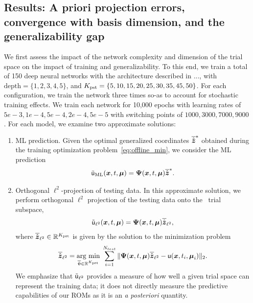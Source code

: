 \documentclass[3p,computermodern,10pt]{elsarticle}
\begin{document}
\subsection{Results: A priori projection errors, convergence with basis dimension, and the generalizability gap}
We first assess the impact of the network complexity and dimension of the trial space on the impact of training and generalizability. To this end, we train a total of 150 deep neural networks with the architecture described in ..., with $\text{depth} = \{1,2,3,4,5\}$, and $K_{\text{pst}} = \{5,10,15,20,25,30,35,45,50\}$. For each configuration, we train the network three times so-as to account for stochastic training effects. We train each network for 10,000 epochs with learning rates of $5e-3,1e-4,5e-4,2e-4,5e-5$ with switching points of $1000,3000,7000,9000$. For each model, we examine two approximate solutions:
\begin{enumerate}
\item ML prediction. Given the optimal generalized coordinates $\overline{\hat{\boldsymbol z}}^*$ obtained during the training optimization problem~\eqref{eq:offline_min}, we consider the ML prediction
$$\tilde{\mathsf{u}}_{\text{ML}}(\boldsymbol x,t,\boldsymbol \mu)= \boldsymbol \Psi(\boldsymbol x,t,\boldsymbol \mu) \overline{\hat{\boldsymbol z}}^*.$$ 
\item Orthogonal $\ell^2$-projection of testing data. In this approximate solution, we perform orthogonal $\ell^2$ projection of the testing data onto the \parametricSpaceTimeAcronym\ trial subspace,
$$\tilde{\mathsf{u}}_{\ell^2}(\boldsymbol x,t,\boldsymbol \mu) = \boldsymbol \Psi(\boldsymbol x,t,\boldsymbol \mu) \overline{\hat{\boldsymbol z}}_{\ell^2},$$
where $\overline{\hat{\boldsymbol z}}_{\ell^2} \in \mathbb{R}^{K_{\text{pst}}}$ is given by the solution to the minimization problem
$$\overline{\hat{\boldsymbol z}}_{\ell^2} = \underset{ \overline{\hat{\boldsymbol v}} \in \mathbb{R}^{K_{\text{pst}}} }{\text{arg min} } \; \sum_{i=1}^{N_{test}} \| \boldsymbol \Psi(\boldsymbol x,t,\boldsymbol \mu) \overline{\hat{\boldsymbol z}}_{\ell^2}  - \mathsf{u}(\boldsymbol x,t_i,\boldsymbol \mu_i) \|_2.$$
We emphasize that $\tilde{\mathsf{u}}_{\ell^2}$ provides a measure of how well a given trial space can represent the training data; it does not directly measure the predictive capabilities of our ROMs as it is an \textit{a posteriori} quantity. 
\end{enumerate}
\end{document}
